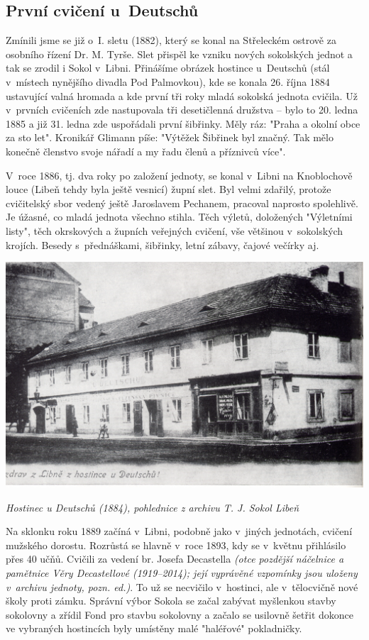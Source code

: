 \documentclass[a5paper, 11pt, twoside]{article}
\newcommand{\pozned}[1]{%
\textit{#1}}
\begin{document}
\subsection{První cvičení u~Deutschů}
Zmínili jsme se již o~I. sletu (1882), který se konal na Střeleckém ostrově za osobního řízení Dr. M. Tyrše. Slet přispěl ke vzniku nových sokolských jednot a tak se zrodil i Sokol v~Libni. Přinášíme obrázek hostince u~Deutschů (stál v~místech nynějšího divadla Pod Palmovkou), kde se konala 26. října 1884 ustavující valná hromada a kde první tři roky mladá sokolská jednota cvičila. Už v~prvních cvičeních zde nastupovala tři desetičlenná družstva – bylo to 20. ledna 1885 a již 31. ledna zde uspořádali první šibřinky. Měly ráz: "Praha a okolní obce za sto let". Kronikář Glimann píše: "Výtěžek Šibřinek byl značný. Tak mělo konečně členstvo svoje nářadí a my řadu členů a příznivců více".

V~roce 1886, tj. dva roky po založení jednoty, se konal v~Libni na Knoblochově louce (Libeň tehdy byla ještě vesnicí) župní slet. Byl velmi zdařilý, protože cvičitelský sbor vedený ještě Jaroslavem Pechanem, pracoval naprosto spolehlivě. Je úžasné, co mladá jednota všechno stihla. Těch výletů, doložených "Výletními listy", těch okrskových a župních veřejných cvičení, vše většinou v~sokolských krojích. Besedy s~přednáškami, šibřinky, letní zábavy, čajové večírky aj.

\includegraphics[width=\textwidth]{img/09_hospoda_u_deutschu.jpg}

\textit{Hostinec u Deutschů (1884), pohlednice z archivu T. J.
Sokol Libeň}

Na sklonku roku 1889 začíná v~Libni, podobně jako v~jiných jednotách, cvičení mužského dorostu. Rozrůstá se hlavně v~roce 1893, kdy se v~květnu přihlásilo přes 40 učňů. Cvičili za vedení br. Josefa Decastella \pozned{(otce pozdější náčelnice a pamětnice Věry Decastellové (1919–2014); její vyprávěné vzpomínky jsou uloženy v~archivu jednoty, pozn. ed.)}. To už se necvičilo v~hostinci, ale v~tělocvičně nové školy proti zámku. Správní výbor Sokola se začal zabývat myšlenkou stavby sokolovny a zřídil Fond pro stavbu sokolovny a začalo se usilovně šetřit dokonce ve vybraných hostincích byly umístěny malé "haléřové" pokladničky.
\end{document}
